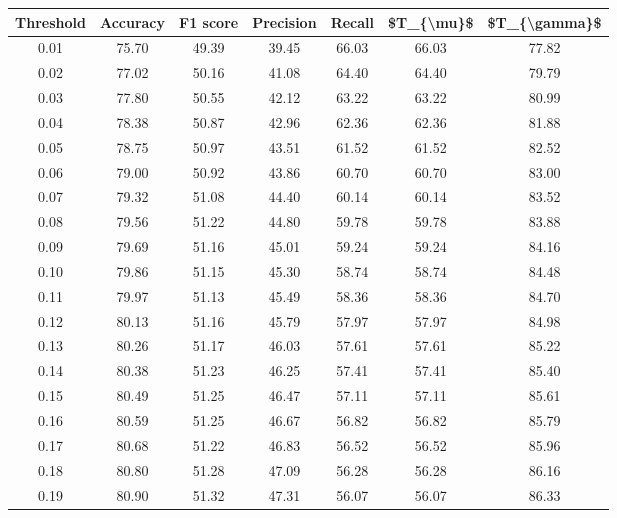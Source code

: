 \begin{tabular}{|c|c|c|c|c|c|c|}
\hline
 Threshold &  Accuracy &  F1 score &  Precision &  Recall &  \$T\_\{\textbackslash mu\}\$ &  \$T\_\{\textbackslash gamma\}\$ \\
\hline
      0.01 &     75.70 &     49.39 &      39.45 &   66.03 &      66.03 &         77.82 \\
      0.02 &     77.02 &     50.16 &      41.08 &   64.40 &      64.40 &         79.79 \\
      0.03 &     77.80 &     50.55 &      42.12 &   63.22 &      63.22 &         80.99 \\
      0.04 &     78.38 &     50.87 &      42.96 &   62.36 &      62.36 &         81.88 \\
      0.05 &     78.75 &     50.97 &      43.51 &   61.52 &      61.52 &         82.52 \\
      0.06 &     79.00 &     50.92 &      43.86 &   60.70 &      60.70 &         83.00 \\
      0.07 &     79.32 &     51.08 &      44.40 &   60.14 &      60.14 &         83.52 \\
      0.08 &     79.56 &     51.22 &      44.80 &   59.78 &      59.78 &         83.88 \\
      0.09 &     79.69 &     51.16 &      45.01 &   59.24 &      59.24 &         84.16 \\
      0.10 &     79.86 &     51.15 &      45.30 &   58.74 &      58.74 &         84.48 \\
      0.11 &     79.97 &     51.13 &      45.49 &   58.36 &      58.36 &         84.70 \\
      0.12 &     80.13 &     51.16 &      45.79 &   57.97 &      57.97 &         84.98 \\
      0.13 &     80.26 &     51.17 &      46.03 &   57.61 &      57.61 &         85.22 \\
      0.14 &     80.38 &     51.23 &      46.25 &   57.41 &      57.41 &         85.40 \\
      0.15 &     80.49 &     51.25 &      46.47 &   57.11 &      57.11 &         85.61 \\
      0.16 &     80.59 &     51.25 &      46.67 &   56.82 &      56.82 &         85.79 \\
      0.17 &     80.68 &     51.22 &      46.83 &   56.52 &      56.52 &         85.96 \\
      0.18 &     80.80 &     51.28 &      47.09 &   56.28 &      56.28 &         86.16 \\
      0.19 &     80.90 &     51.32 &      47.31 &   56.07 &      56.07 &         86.33 \\

\end{tabular}
